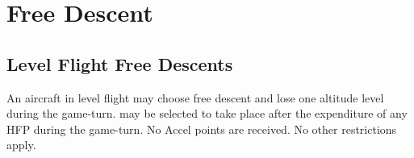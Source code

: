 \section{Free Descent}
\label{rule:free-descent}

\subsection{Level Flight Free Descents} An aircraft in level flight may choose free descent and lose one altitude level during the game-turn.  may be selected to take place after the expenditure of any HFP during the game-turn. No Accel points are received. No other restrictions apply.

